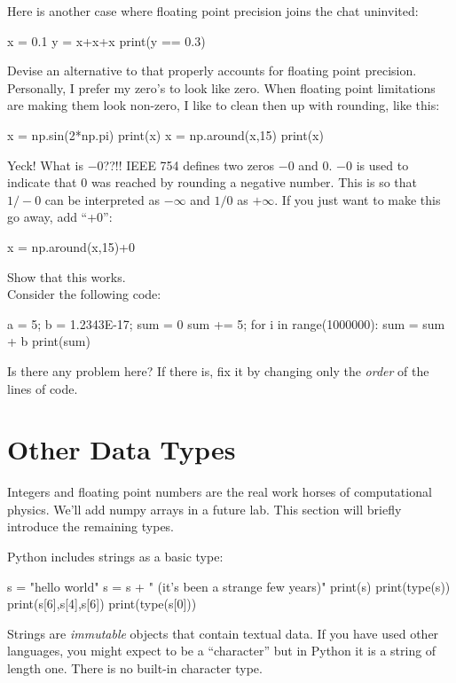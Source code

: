 \plot Here is another case where floating point precision joins the
chat uninvited:
\begin{python}
x = 0.1
y = x+x+x
print(y == 0.3)
\end{python}
Devise an alternative to  that properly accounts for
floating point precision.\\

\plot Personally, I prefer my zero's to look like zero.  When floating
point limitations are making them look non-zero, I like to clean then
up with rounding, like this:
\begin{python}
x = np.sin(2*np.pi)
print(x)
x = np.around(x,15)
print(x)
\end{python}
Yeck! What is $-0$??!!  IEEE 754 defines two zeros $-0$ and $0$.  $-0$
is used to indicate that $0$ was reached by rounding a negative
number.  This is so that $1/-0$ can be interpreted as $-\infty$ and
$1/0$ as $+\infty$.  If you just want to make this go away, add ``+0'':
\begin{python}
x = np.around(x,15)+0
\end{python}
Show that this works.\\

\plot Consider the following code:
\begin{python}
a = 5;
b = 1.2343E-17;
sum = 0
sum += 5;
for i in range(1000000):
    sum = sum + b
print(sum)
\end{python}
Is there any problem here?  If there is, fix it by changing only the {\em order} of the lines of code.


\section{Other Data Types}

Integers and floating point numbers are the real work horses of
computational physics.  We'll add numpy arrays in a future lab.  This
section will briefly introduce the remaining types.

Python includes strings as a basic type:
\begin{python}
s = "hello world"
s = s + " (it's been a strange few years)"
print(s)
print(type(s))
print(s[6],s[4],s[6])
print(type(s[0]))
\end{python}
Strings are {\em immutable} objects that contain textual data.  If you
have used other languages, you might expect  to be a
``character'' but in Python it is a string of length one.  There is no
built-in character type.


